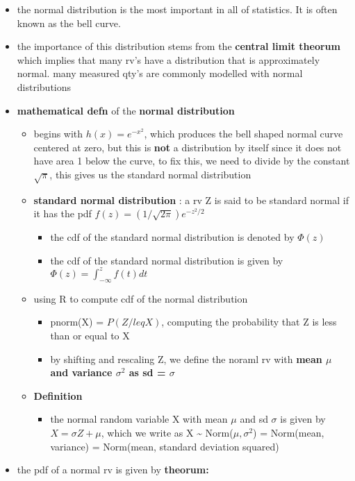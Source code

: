 \documentclass[
]{article}
\providecommand{\tightlist}{%
  \setlength{\itemsep}{0pt}\setlength{\parskip}{0pt}}
\begin{document}
\begin{itemize}
\tightlist
\item
  the normal distribution is the most important in all of statistics. It
  is often known as the bell curve.
\item
  the importance of this distribution stems from the \textbf{central
  limit theorum} which implies that many rv's have a distribution that
  is approximately normal. many measured qty's are commonly modelled
  with normal distributions
\item
  \textbf{mathematical defn} of the \textbf{normal distribution}

  \begin{itemize}
  \tightlist
  \item
    begins with \(h(x) = e^{-x^2}\), which produces the bell shaped
    normal curve centered at zero, but this is \textbf{not} a
    distribution by itself since it does not have area 1 below the
    curve, to fix this, we need to divide by the constant
    \(\sqrt{\pi}\), this gives us the standard normal distribution
  \item
    \textbf{standard normal distribution} : a rv Z is said to be
    standard normal if it has the pdf
    \(f(z) = (1/\sqrt{2\pi})e^{-z^2/2}\)

    \begin{itemize}
    \tightlist
    \item
      the cdf of the standard normal distribution is denoted by
      \(\Phi(z)\)
    \item
      the cdf of the standard normal distribution is given by
      \(\Phi(z) = \int_{-\infty}^{z}f(t)dt\)
    \end{itemize}
  \item
    using R to compute cdf of the normal distribution

    \begin{itemize}
    \tightlist
    \item
      pnorm(X) = \(P(Z /leq X)\), computing the probability that Z is
      less than or equal to X
    \item
      by shifting and rescaling Z, we define the noraml rv with
      \textbf{mean \(\mu\) and variance \(\sigma^2\) as sd = \(\sigma\)}
    \end{itemize}
  \item
    \textbf{Definition}

    \begin{itemize}
    \tightlist
    \item
      the normal random variable X with mean \(\mu\) and sd \(\sigma\)
      is given by \(X = \sigma Z + \mu\), which we write as X
      \textasciitilde{} Norm(\(\mu, \sigma^2\)) = Norm(mean, variance) =
      Norm(mean, standard deviation squared)
    \end{itemize}
  \end{itemize}
\item
  the pdf of a normal rv is given by \textbf{theorum:}


\end{itemize}
\end{document}
